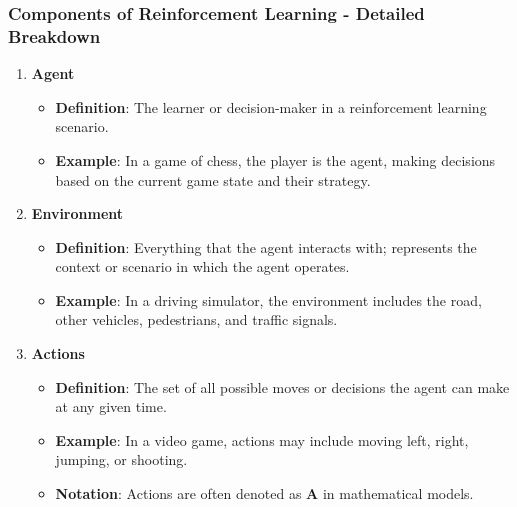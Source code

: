 \documentclass[aspectratio=169]{beamer}
\begin{document}
\begin{frame}[fragile]
    \frametitle{Components of Reinforcement Learning - Detailed Breakdown}
    \begin{enumerate}
        \item \textbf{Agent}
        \begin{itemize}
            \item \textbf{Definition}: The learner or decision-maker in a reinforcement learning scenario.
            \item \textbf{Example}: In a game of chess, the player is the agent, making decisions based on the current game state and their strategy.
        \end{itemize}

        \item \textbf{Environment}
        \begin{itemize}
            \item \textbf{Definition}: Everything that the agent interacts with; represents the context or scenario in which the agent operates.
            \item \textbf{Example}: In a driving simulator, the environment includes the road, other vehicles, pedestrians, and traffic signals.
        \end{itemize}

        \item \textbf{Actions}
        \begin{itemize}
            \item \textbf{Definition}: The set of all possible moves or decisions the agent can make at any given time.
            \item \textbf{Example}: In a video game, actions may include moving left, right, jumping, or shooting.
            \item \textbf{Notation}: Actions are often denoted as \textbf{A} in mathematical models.
        \end{itemize}
    \end{enumerate}
\end{frame}
\end{document}
